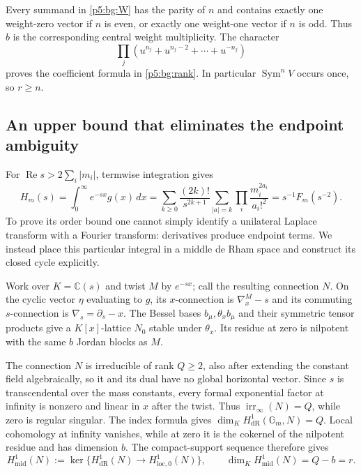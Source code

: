 \documentclass[11pt,a4paper]{article}
\theoremstyle{definition}
\theoremstyle{remark}
\numberwithin{equation}{section}
\begin{document}
Every summand in \eqref{p5:bg:W} has the parity of $n$ and contains
exactly one weight-zero vector if $n$ is even, or exactly one
weight-one vector if $n$ is odd.  Thus $b$ is the corresponding
central weight multiplicity.  The character
\[
 \prod_j(u^{n_j}+u^{n_j-2}+\cdots+u^{-n_j})
\]
proves the coefficient formula in \eqref{p5:bg:rank}.
In particular $\operatorname{Sym}^nV$ occurs once, so $r\ge n$.

\subsection{An upper bound that eliminates the endpoint ambiguity}

For $\operatorname{Re}s>2\sum_i|m_i|$, termwise integration gives
\begin{equation}\label{p5:bg:Laplace}
 H_m(s)=\int_0^\infty e^{-sx}g(x)\,dx
       =\sum_{k\ge0}\frac{(2k)!}{s^{2k+1}}
                   \sum_{|a|=k}\prod_i\frac{m_i^{2a_i}}{a_i!^2}
       =s^{-1}F_m(s^{-2}).
\end{equation}
To prove its order bound one cannot simply identify a unilateral
Laplace transform with a Fourier transform: derivatives produce
endpoint terms.  We instead place this particular integral in a
middle de Rham space and construct its closed cycle explicitly.

Work over $K=\mathbb C(s)$ and twist $M$ by $e^{-sx}$; call the
resulting connection $N$.  On the cyclic vector $\eta$ evaluating to
$g$, its $x$-connection is $\nabla_x^M-s$ and its commuting
$s$-connection is $\nabla_s=\partial_s-x$.  The Bessel bases
$b_\mu,\theta_xb_\mu$ and their symmetric tensor products give a
$K[x]$-lattice $N_0$ stable under $\theta_x$.  Its residue at zero
is nilpotent with the same $b$ Jordan blocks as $M$.

The connection $N$ is irreducible of rank $Q\ge2$, also after
extending the constant field algebraically, so it and its dual
have no global horizontal vector.  Since $s$ is transcendental
over the mass constants, every formal exponential factor at
infinity is nonzero and linear in $x$ after the twist.  Thus
$\operatorname{irr}_\infty(N)=Q$, while zero is regular singular.
The index formula gives $\dim_K H^1_{\mathrm{dR}}(\mathbb G_m,N)=Q$.
Local cohomology at infinity vanishes, while at zero it is the
cokernel of the nilpotent residue and has dimension $b$.
The compact-support sequence therefore gives
\begin{equation}\label{p5:bg:middle}
 H^1_{\mathrm{mid}}(N):=
 \ker\{H^1_{\mathrm{dR}}(N)\longrightarrow H^1_{\mathrm{loc},0}(N)\},
 \qquad \dim_K H^1_{\mathrm{mid}}(N)=Q-b=r.
\end{equation}
\end{document}
